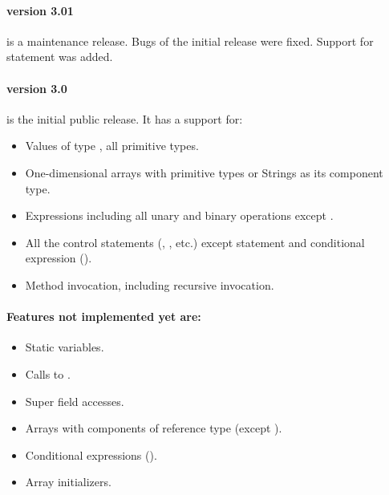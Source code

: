 \paragraph{version 3.01} is a maintenance release. Bugs of the initial
release were fixed. Support for  statement was added.

\paragraph{version 3.0} is the initial public release. It has a support for:
\begin{itemize}
\item Values of type , all primitive types.
\item One-dimensional arrays with primitive types or Strings as its component type.
\item Expressions including all unary and binary operations except .
\item All the control statements (, , etc.) except  statement
and conditional expression ().
\item Method invocation, including recursive invocation.
\end{itemize}

\paragraph{Features not implemented yet are:}
\begin{itemize}
\item Static variables.
\item Calls to .
\item Super field accesses.
\item Arrays with components of reference type (except ).
\item Conditional expressions ().
\item Array initializers.
\end{itemize}
